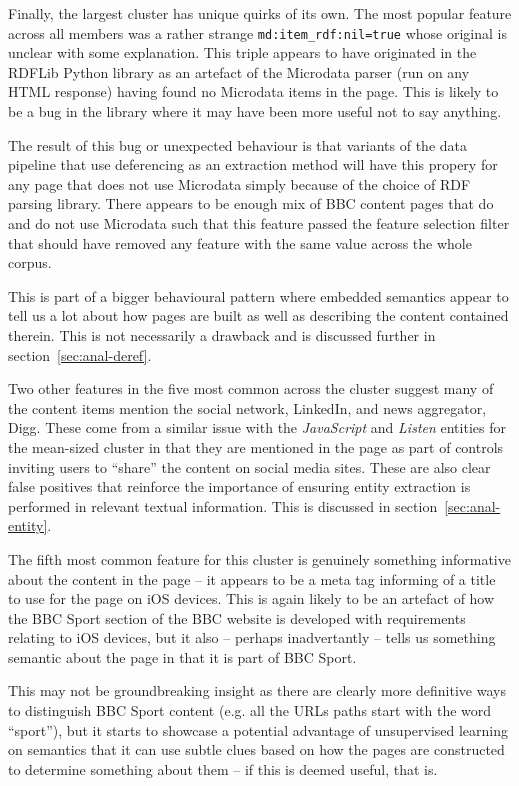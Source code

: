 Finally, the largest cluster has unique quirks of its own. The most
popular feature across all members was a rather strange
\texttt{md:item\_rdf:nil=true} whose original is unclear with some
explanation. This triple appears to have originated in the RDFLib
Python library as an artefact of the Microdata parser (run on any
HTML response) having found no Microdata items in the page. This is
likely to be a bug in the library where it may have been more useful
not to say anything.

The result of this bug or unexpected behaviour is that variants
of the data pipeline that use deferencing as an extraction method will
have this propery for any page that does not use Microdata simply
because of the choice of RDF parsing library. There appears to be
enough mix of BBC content pages that do and do not use Microdata such
that this feature passed the feature selection filter that should
have removed any feature with the same value across the whole corpus.

This is part of a bigger behavioural pattern where embedded semantics
appear to tell us a lot about how pages are built as well as
describing the content contained therein. This is not necessarily a
drawback and is discussed further in section~\ref{sec:anal-deref}.

Two other features in the five most common across the cluster suggest
many of the content items mention the social network, LinkedIn, and
news aggregator, Digg. These come from a similar issue with the
\emph{JavaScript} and \emph{Listen} entities for the mean-sized
cluster in that they are mentioned in the page as part of controls
inviting users to ``share'' the content on social media sites. These
are also clear false positives that reinforce the importance of
ensuring entity extraction is performed in relevant textual
information. This is discussed in section~\ref{sec:anal-entity}.

The fifth most common feature for this cluster is genuinely something
informative about the content in the page -- it appears to be a meta
tag informing of a title to use for the page on iOS devices. This is
again likely to be an artefact of how the BBC Sport section of the
BBC website is developed with requirements relating to iOS devices,
but it also -- perhaps inadvertantly -- tells us something semantic
about the page in that it is part of BBC Sport.

This may not be groundbreaking insight as there are clearly more
definitive ways to distinguish BBC Sport content (e.g. all the URLs
paths start with the word ``sport''), but it starts to showcase a
potential advantage of unsupervised learning on semantics that it
can use subtle clues based on how the pages are constructed to
determine something about them -- if this is deemed useful, that is.

